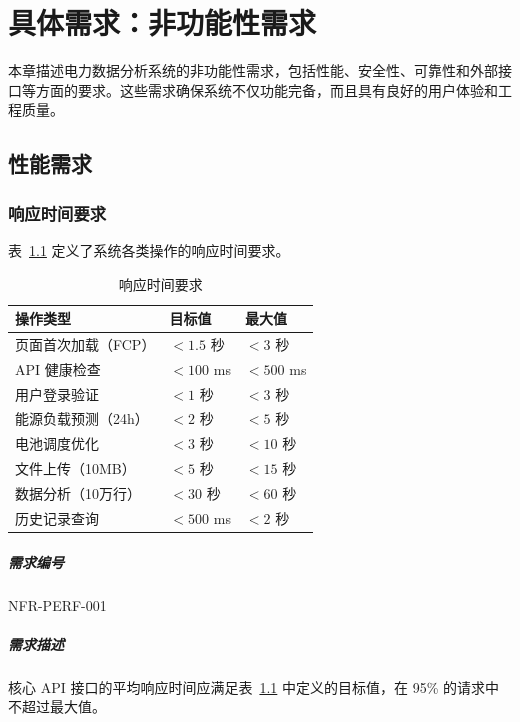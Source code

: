 \chapter{具体需求：非功能性需求}

本章描述电力数据分析系统的非功能性需求，包括性能、安全性、可靠性和外部接口等方面的要求。这些需求确保系统不仅功能完备，而且具有良好的用户体验和工程质量。

\section{性能需求}

\subsection{响应时间要求}

表~\ref{tab:response-time} 定义了系统各类操作的响应时间要求。

\begin{table}[htbp]
    \centering
    \caption{响应时间要求}
    \label{tab:response-time}
    \begin{tabularx}{\textwidth}{@{}X l l@{}}
        \toprule
        \textbf{操作类型} & \textbf{目标值} & \textbf{最大值} \\
        \midrule
        页面首次加载（FCP）   & $< 1.5$ 秒    & $< 3$ 秒      \\
        API 健康检查      & $< 100$ ms   & $< 500$ ms   \\
        用户登录验证        & $< 1$ 秒      & $< 3$ 秒      \\
        能源负载预测（24h）   & $< 2$ 秒      & $< 5$ 秒      \\
        电池调度优化        & $< 3$ 秒      & $< 10$ 秒     \\
        文件上传（10MB）    & $< 5$ 秒      & $< 15$ 秒     \\
        数据分析（10万行）    & $< 30$ 秒     & $< 60$ 秒     \\
        历史记录查询        & $< 500$ ms   & $< 2$ 秒      \\
        \bottomrule
    \end{tabularx}
\end{table}

\paragraph{需求编号} NFR-PERF-001

\paragraph{需求描述} 核心 API 接口的平均响应时间应满足表~\ref{tab:response-time} 中定义的目标值，在 95\% 的请求中不超过最大值。

